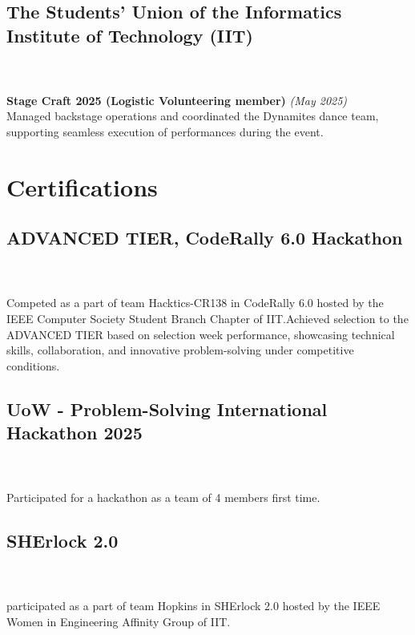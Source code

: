 \documentclass[a4paper,10pt]{article}
\begin{document}
\subsection*{The Students’ Union of the Informatics Institute of Technology (IIT)}\\
\textit\\
\textbf{Stage Craft 2025 (Logistic Volunteering member)} \hfill \textit{(May 2025)}
\textit\\
Managed backstage operations and coordinated the Dynamites dance team, supporting seamless execution of performances during the event.



\section*{ Certifications}
\subsection*{ADVANCED TIER, CodeRally 6.0 Hackathon}\\
\textit\\
Competed as a part of team Hacktics-CR138 in CodeRally 6.0 hosted by the IEEE Computer Society Student Branch Chapter of IIT.Achieved selection to the ADVANCED TIER based on selection week performance, showcasing technical skills, collaboration, and innovative problem-solving under competitive conditions.

\subsection*{UoW - Problem-Solving International Hackathon 2025}\\
\textit\\
Participated for a hackathon as a team of 4 members first time.

\subsection*{SHErlock 2.0}\\
\textit\\
participated as a part of team Hopkins in SHErlock 2.0 hosted by the IEEE Women in Engineering Affinity Group of IIT.


\end{document}
